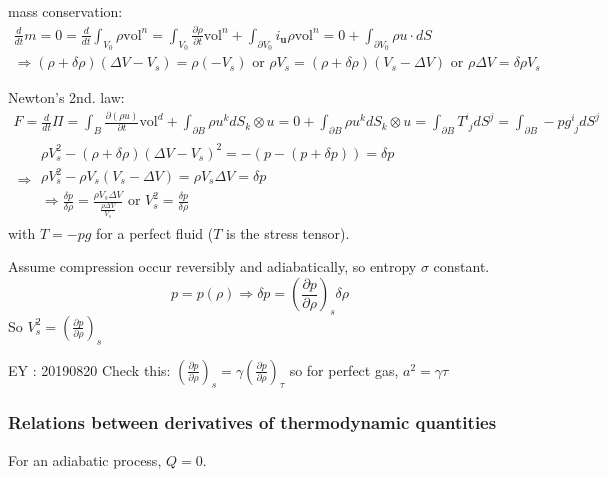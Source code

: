 \documentclass[twoside,landscape,10pt]{amsart}
\theoremstyle{plain}
\theoremstyle{definition}
\theoremstyle{remark}
\theoremstyle{remark}
\begin{document}
\begin{multicols*}{2}
mass conservation:
\[
\begin{gathered}
\frac{d}{dt} m = 0 = \frac{d}{dt} \int_{V_0} \rho \text{vol}^n = \int_{V_0} \frac{ \partial \rho }{ \partial t} \text{vol}^n + \int_{\partial V_0} i_{\mathbf{u}} \rho \text{vol}^n = 0 + \int_{\partial V_0} \rho u \cdot dS \\ 
\Longrightarrow (\rho + \delta \rho) (\Delta V - V_s) = \rho (-V_s) \text{ or } \rho V_s = (\rho + \delta \rho) (V_s - \Delta V) \text{ or } \rho \Delta V = \delta \rho V_s
\end{gathered}
\]

Newton's 2nd. law:
\[
\begin{gathered}
F = \frac{d}{dt} \Pi = \int_B \frac{ \partial ( \rho u)}{ \partial t} \text{vol}^d + \int_{\partial B} \rho u^k dS_k \otimes u = 0 + \int_{\partial B} \rho u^k dS_k \otimes u = \int_{\partial B} T^i_{ \, \, j } dS^j = \int_{\partial B} - p g^i_{\, \, j} dS^j   \\
\Longrightarrow \begin{gathered}
\rho V_s^2 - (\rho + \delta \rho) (\Delta V - V_s)^2 = - ( p - (p + \delta p)) = \delta p \\ 
\rho V_s^2 - \rho V_s (V_s - \Delta V) = \rho V_s \Delta V = \delta p  \\
\Longrightarrow \frac{ \delta p }{ \delta \rho } = \frac{ \rho V_s \Delta V}{ \frac{ \rho \Delta V}{ V_s} } \text{ or } V_s^2 = \frac{ \delta p}{ \delta \rho} 
\end{gathered}
\end{gathered}
\]
with $T = -pg$ for a perfect fluid ($T$ is the stress tensor).

Assume compression occur reversibly and adiabatically, so entropy $\sigma$ constant. 
\[
p = p(\rho) \Longrightarrow \delta p = \left( \frac{ \partial p}{\partial \rho} \right)_s \delta \rho
\]
So $V_s^2 = \left( \frac{ \partial p }{ \partial \rho} \right)_s$

EY : 20190820 Check this: $\left( \frac{\partial p }{\partial \rho} \right)_s = \gamma \left( \frac{ \partial p }{\partial \rho} \right)_{\tau}$ so for perfect gas, $a^2 = \gamma \tau$


\subsubsection{Relations between derivatives of thermodynamic quantities}

For an adiabatic process, $Q=0$. 


\end{multicols*}
\end{document}
